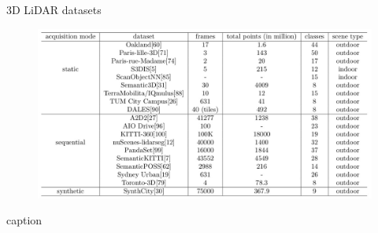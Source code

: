 \documentclass[aspectratio=169]{beamer}
\begin{document}
\begin{frame}{3D LiDAR datasets}
    \begin{figure}
        \centering
        \includegraphics[scale=0.25]{images/3d_datasets.jpg}
    \end{figure}
    \begin{table}
        \caption{caption}
    \end{table}
\end{frame}
\end{document}

